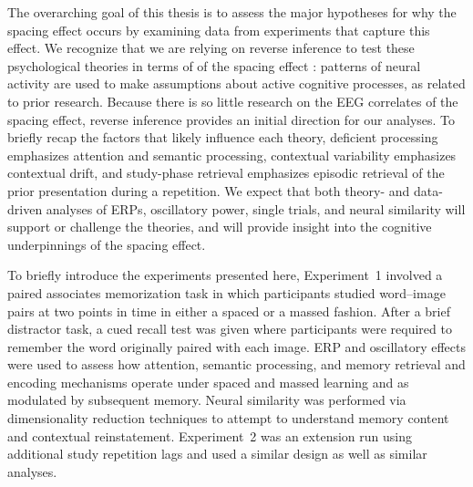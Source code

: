 
The overarching goal of this thesis is to assess the major hypotheses for why the spacing effect occurs by examining data from experiments that capture this effect.
We recognize that we are relying on reverse inference to test these psychological theories in terms of of the spacing effect \cite{Pold2006,PoldWagn2004}: patterns of neural activity are used to make assumptions about active cognitive processes, as related to prior research.  Because there is so little research on the EEG correlates of the spacing effect, reverse inference provides an initial direction for our analyses.
To briefly recap the factors that likely influence each theory, deficient processing emphasizes attention and semantic processing, contextual variability emphasizes contextual drift,
and study-phase retrieval emphasizes episodic retrieval of the prior presentation during a repetition.
We expect that both theory- and data-driven analyses of ERPs, oscillatory power, single trials, and
neural similarity will support or challenge the theories, and will provide insight into the cognitive underpinnings of the spacing effect.

To briefly introduce the experiments presented here,
Experiment~1 involved a paired associates memorization task in which participants studied word--image pairs at two points in time in either a spaced or a massed fashion.  After a brief distractor task, a cued recall test was given where participants were required to remember the word originally paired with each image.
ERP and oscillatory effects were used to assess how attention, semantic processing, and memory retrieval and encoding mechanisms operate under spaced and massed learning and as modulated by subsequent memory.  Neural similarity was performed via dimensionality reduction techniques to attempt to understand memory content and contextual reinstatement.
Experiment~2 was an extension run using additional study repetition lags and used a similar design as well as similar analyses.


